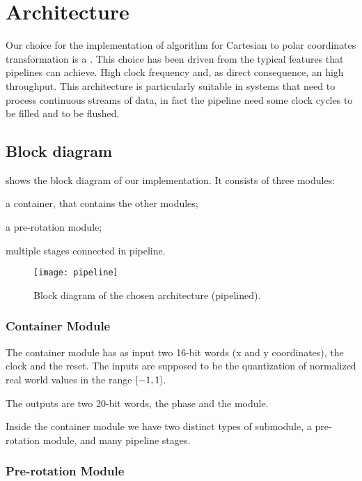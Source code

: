 \section{Architecture}\label{sec:arch}

Our choice for the implementation of \cordic{} algorithm for Cartesian to polar
coordinates transformation is a . This choice
has been driven from the typical features that pipelines can achieve. High clock
frequency and, as direct consequence, an high throughput. This architecture is
particularly suitable in systems that need to process continuous streams of
data, in fact the pipeline need some clock cycles to be filled and to be
flushed.

\subsection{Block diagram}

 shows the block diagram of our implementation. It
consists of three modules:
\begin{enumerate*}[label=]
	\item a container, that contains the other modules;
	\item a pre-rotation module;
	\item multiple stages connected in pipeline.
\end{enumerate*}

\begin{figure}[p]
	\texttt{[image: pipeline]}
	\caption{Block diagram of the chosen architecture (pipelined).}\label{fig:blockdiagram}
\end{figure}

\subsubsection{Container Module}

The container module has as input two 16-bit words (x and y coordinates), the
clock and the reset. The inputs are supposed to be the quantization of
normalized real world values in the range \(\interval{-1}{1}\).

The outputs are two 20-bit words, the phase and the module.

Inside the container module we have two distinct types of submodule, a
pre-rotation module, and many pipeline stages.

\subsubsection{Pre-rotation Module}

